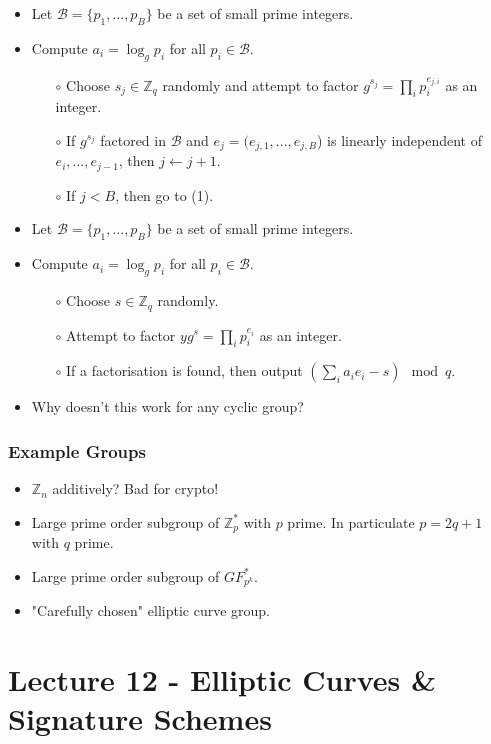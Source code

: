 \documentclass[a4paper]{scrartcl}
\begin{document}
\begin{itemize}
\item Let $\mathcal{B} = \{p_1, ..., p_B\}$ be a set of small prime integers.
\item Compute $a_i = \log_g p_i$ for all $p_i \in \mathcal{B}$.
\begin{itemize}
\item [$\circ$] Choose $s_j \in \mathbb{Z}_q$ randomly and attempt to factor $g^{s_j} = \prod_i p_i^{e_{j,i}}$ as an integer.
\item [$\circ$] If $g^{s_j}$ factored in $\mathcal{B}$ and $e_j = (e_{j,1}, ..., e_{j,B}$) is linearly independent of $e_i, ..., e_{j-1}$, then $j \gets j + 1$.
\item [$\circ$] If $j < B$, then go to (1).
\end{itemize}

\item Let $\mathcal{B} = \{p_1, ..., p_B\}$ be a set of small prime integers.
\item Compute $a_i = \log_g p_i$ for all $p_i \in \mathcal{B}$.
\begin{itemize}
\item [$\circ$] Choose $s \in \mathbb{Z}_q$ randomly.
\item [$\circ$] Attempt to factor $yg^s = \prod_i p_i^{e_i}$ as an integer.
\item [$\circ$] If a factorisation is found, then output $(\sum_i a_ie_i-s) \mod q$. 
\end{itemize}
\item Why doesn't this work for any cyclic group?
\end{itemize}

\subsubsection*{Example Groups}

\begin{itemize}
\item $\mathbb{Z}_n$ additively? Bad for crypto!
\item Large prime order subgroup of $\mathbb{Z}_p^*$ with $p$ prime. In particulate $p = 2q+1$ with $q$ prime.
\item Large prime order subgroup of $GF_{p^k}^*$.
\item "Carefully chosen" elliptic curve group.
\end{itemize}

\section*{Lecture 12 - Elliptic Curves \& Signature Schemes}
\end{document}
